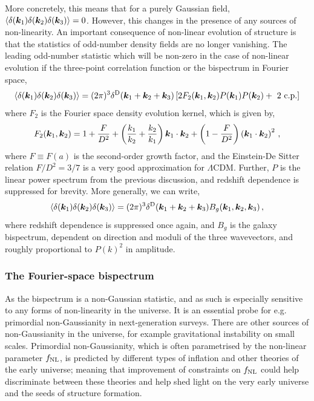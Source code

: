More concretely, this means that for a purely Gaussian field, $\langle \delta(\bm {k}_1) \delta(\bm {k}_2) \delta(\bm {k}_3)\rangle = 0$. However, this changes in the presence of any sources of non-linearity. An important consequence of non-linear evolution of structure is that the statistics of odd-number density fields are no longer vanishing. The leading odd-number statistic which will be non-zero in the case of non-linear evolution if the three-point correlation function or the bispectrum in Fourier space, 
\begin{equation}
	\langle \delta(\bm {k}_1) \delta(\bm {k}_2) \delta(\bm {k}_3) \rangle = (2 \pi )^3 \delta^\mathrm{D}(\bm {k}_1 + \bm {k}_2 + \bm {k}_3) \left[ 2 F_2(\bm {k}_1,\bm {k}_2) P(\bm {k}_1) P(\bm {k}_2) + \text{ 2 c.p.} \right]
\end{equation}
where $F_2$ is the Fourier space density evolution kernel, which is given by, 
\begin{equation}
	F_2(\bm {k}_1,\bm {k}_2) = 1 + \frac{F}{D^2} + \left( \frac{k_1}{k_2} + \frac{k_2}{k_1} \right) \bm {k}_1 \cdot \bm {k}_2 + \left( 1 - \frac{F}{D^2} \right) \left( \bm {k}_1 \cdot \bm {k}_2 \right)^2\,,	
\end{equation}
where $F \equiv F(a)$ is the second-order growth factor, and the Einstein-De Sitter relation $F/D^2 = 3/7$ is a very good approximation for $\Lambda$CDM. Further, $P$ is the linear power spectrum from the previous discussion, and redshift dependence is suppressed for brevity. More generally, we can write, 
\begin{equation}
	\langle \delta(\bm {k}_1) \delta(\bm {k}_2) \delta(\bm {k}_3) \rangle = (2 \pi )^3 \delta^\mathrm{D}(\bm {k}_1 + \bm {k}_2 + \bm {k}_3) B_g(\bm {k}_1,\bm {k}_2,\bm {k}_3)\,,
\end{equation}
where redshift dependence is suppressed once again, and $B_g$ is the galaxy bispectrum, dependent on direction and moduli of the three wavevectors, and roughly proportional to $P(k)^2$ in amplitude.


\subsubsection{The Fourier-space bispectrum}

As the bispectrum is a non-Gaussian statistic, and as such is especially sensitive to any forms of non-linearity in the universe. It is an essential probe for e.g. primordial non-Gaussianity in next-generation surveys. There are other sources of non-Gaussianity in the universe, for example gravitational instability on small scales. Primordial non-Gaussianity, which is often parametrised by the non-linear parameter $f_\text{NL}$, is predicted by different types of inflation and other theories of the early universe; meaning that improvement of constraints on $f_\text{NL}$ could help discriminate between these theories and help shed light on the very early universe and the seeds of structure formation. 

